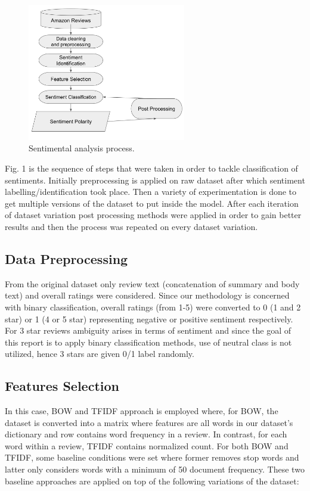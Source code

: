 \documentclass[conference]{IEEEtran}
\begin{document}
\begin{figure}[htbp]
\centerline{\includegraphics[width=0.8\columnwidth , height=6cm]{flowchart.png}}
\caption{Sentimental analysis process.}
\label{fig}
\end{figure}
\FloatBarrier
Fig. 1 is the sequence of steps that were taken in order to tackle classification of sentiments. Initially preprocessing is applied on raw dataset after which sentiment labelling/identification took place. Then a variety of experimentation is done to get multiple versions of the dataset to put inside the model. After each iteration of dataset variation post processing methods were applied in order to gain better results and then the process was repeated on every dataset variation.

\subsection{Data Preprocessing}
From the original dataset only review text (concatenation of summary and body text) and overall ratings were considered. Since our methodology is concerned with binary classification, overall ratings (from 1-5) were converted to 0 (1 and 2 star) or 1 (4 or 5 star) representing negative or positive sentiment respectively. For 3 star reviews ambiguity arises in terms of sentiment and since the goal of this report is to apply binary classification methods, use of neutral class is not utilized, hence 3 stars are given 0/1 label randomly.
\subsection{Features Selection}
In this case, BOW and TFIDF approach is employed where, for BOW, the dataset is converted into a matrix where features are all words in our dataset’s dictionary and row contains word frequency in a review. In contrast, for each word within a review, TFIDF contains normalized count. For both BOW and TFIDF, some baseline conditions were set where former removes stop words and latter only considers words with a minimum of 50 document frequency. These two baseline approaches are applied on top of the following variations of the dataset:
\end{document}
